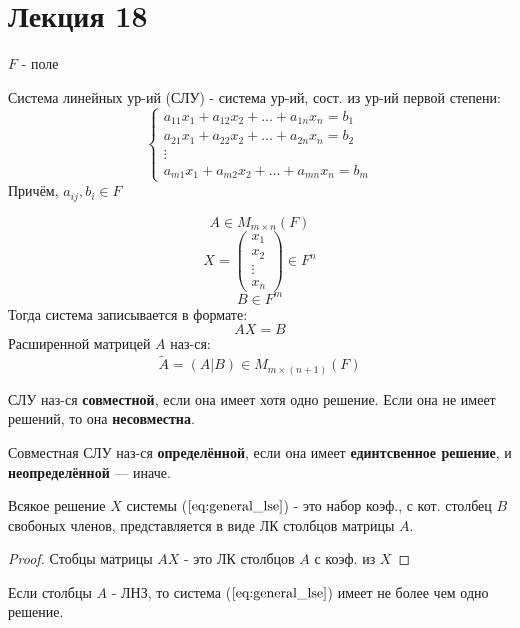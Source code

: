 \section{Лекция 18}
$F$ - поле
\begin{definition}
Система линейных ур-ий (СЛУ) - система ур-ий, сост. из ур-ий первой степени:
\begin{equation}
  \label{eq:general_lse}
\begin{cases}
a_{11} x_1 + a_{12} x_2 + \ldots + a_{1n} x_n = b_1 \\
a_{21} x_1 + a_{22} x_2 + \ldots + a_{2n} x_n = b_2 \\
\vdots \\
a_{m1} x_1 + a_{m 2} x_2 + \ldots + a_{mn} x_n = b_m
\end{cases}
\end{equation}
 Причём, $a_{ij}, b_i \in F$ \\
\end{definition}
\begin{symb}
  \[
  A \in M_{m \times n}(F)
  \]
  \[
  X = \begin{pmatrix}x_1 \\ x_2 \\ \vdots \\ x_n \end{pmatrix} \in F^{n}
  \]
  \[
  B \in F^{m}
  \]
  Тогда система записывается в формате:
  \[
  AX = B
  \]
  Расширенной матрицей $A$ наз-ся:
  \[
  \widetilde{A} = (A | B) \in M_{m \times (n + 1)}(F)
  \]
\end{symb}
\begin{definition}
СЛУ наз-ся \textbf{совместной}, если она имеет хотя одно решение. Если она не имеет решений, то она \textbf{несовместна}.
\end{definition}
\begin{definition}
Совместная СЛУ наз-ся \textbf{определённой}, если она имеет \textbf{единтсвенное решение}, и \textbf{неопределённой} ---  иначе.
\end{definition}
\begin{statement}
Всякое решение $X$ системы ($\ref{eq:general_lse}$) - это набор коэф., с кот. столбец $B$ свобоных членов, представляется в виде ЛК столбцов матрицы $A$.
\end{statement}
\begin{proof}
Стобцы матрицы $AX$ - это ЛК столбцов $A$ с коэф. из $X$
\end{proof}
\begin{consequence}
Если столбцы $A$ - ЛНЗ, то система ($\ref{eq:general_lse}$) имеет не более чем одно решение.
\end{consequence}
